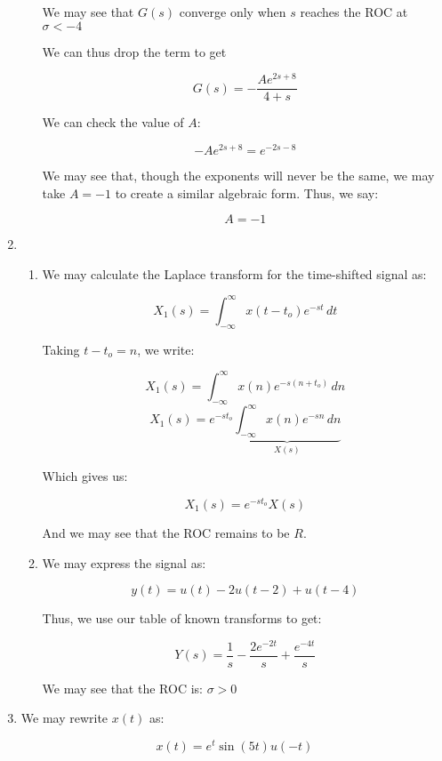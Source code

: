 \begin{enumerate}
\begin{enumerate}
        We may see that $G(s)$ converge only when $s$ reaches the ROC at $\sigma<-4$

        We can thus drop the term to get

        $$G(s)=-\frac{Ae^{2s+8}}{4+s}$$

        We can check the value of $A$:

        $$-Ae^{2s+8}=e^{-2s-8}$$

        We may see that, though the exponents will never be the same, we may take $A=-1$ to create a similar algebraic form. Thus, we say:

        $$\boxed{A=-1}$$

    \end{enumerate}

  \item

    \begin{enumerate}

      \item We may calculate the Laplace transform for the time-shifted signal as:

        $$X_1(s)=\int_{-\infty}^{\infty}x(t-t_o)e^{-st}\,dt$$

        Taking $t-t_o= n$, we write:

        $$X_1(s)=\int_{-\infty}^{\infty}x(n)e^{-s(n+t_o)}\,dn$$
        $$X_1(s)=e^{-st_o}\underbrace{\int_{-\infty}^{\infty}x(n)e^{-sn}\,dn}_{X(s)}$$

        Which gives us:

        $$\boxed{X_1(s)=e^{-st_o}X(s)}$$

        And we may see that the ROC remains to be $R$.

      \item We may express the signal as:

        $$y(t)=u(t)-2u(t-2)+u(t-4)$$

        Thus, we use our table of known transforms to get:

        $$\boxed{Y(s)=\frac{1}{s}-\frac{2e^{-2t}}{s}+\frac{e^{-4t}}{s}}$$

        We may see that the ROC is: $\boxed{\sigma>0}$

    \end{enumerate}

  \item

    We may rewrite $x(t)$ as:

    $$x(t)=e^t\sin(5t)u(-t)$$


\end{enumerate}
